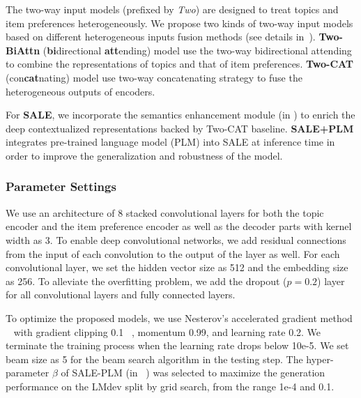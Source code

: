 The two-way input models (prefixed by \emph{Two})
are designed to treat topics and item preferences heterogeneously.
We propose two kinds of two-way input models
based on different heterogeneous inputs fusion methods 
(see details in~).
\textbf{Two-BiAttn} (\textbf{bi}directional \textbf{att}ending) model use the two-way bidirectional attending
to combine the representations of topics and that of item preferences.
\textbf{Two-CAT} (con\textbf{cat}nating) model use two-way concatenating strategy 
to fuse the heterogeneous outputs of encoders.

For \textbf{SALE}, 
we incorporate the semantics enhancement module
(in ) to enrich
the deep contextualized representations
backed by Two-CAT baseline.
\textbf{SALE+PLM} integrates
pre-trained language model (PLM) 
into SALE at inference time in order to improve
the generalization and robustness of the model.

\subsubsection{Parameter Settings}
We use an architecture of 8 stacked convolutional layers 
for both the topic encoder and the item preference encoder
as well as the decoder parts with kernel width as 3.
To enable deep convolutional networks, 
we add residual connections~\cite{he2016deep} from the input of each convolution
to the output of the layer as well.
For each convolutional layer, we set the hidden vector size as 512
and the embedding size as 256.
To alleviate the overfitting problem, we add the dropout ($p=0.2$)
layer~\cite{srivastava2014dropout} for all convolutional layers and fully connected layers.

To optimize the proposed models,
we use Nesterov's accelerated gradient method
~\cite{sutskever2013importance} with gradient clipping 0.1
~\cite{pascanu2013difficulty},
momentum 0.99, and 
learning rate 0.2.
We terminate the training process when the learning rate drops 
below 10e-5.
We set beam size as 5 for the beam search algorithm
in the testing step.
The hyper-parameter $\beta$ of SALE-PLM (in ~)
was selected to maximize the generation performance
on the LMdev split by grid search, from the range 1e-4 and 0.1.


